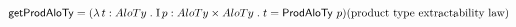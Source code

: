 \documentclass{article}
\newcommand{\axNote}[1]{\hfill (\text{#1})}
\newcommand{\axNoteNL}[1]{\\ \text{} \axNote{#1}}
\begin{document}
\begin{theory-ext}
{%


\item $\mName{getProdAloTy} = 
\cFunAbs{t}{AloTy}{
\cDefDesX{p}{AloTy\times AloTy}{
        {t = \mName{ProdAloTy}\ p}
    }}
    \axNoteNL{product type extractability law}
    $

    
\ee
}
\end{theory-ext}




\end{document}
